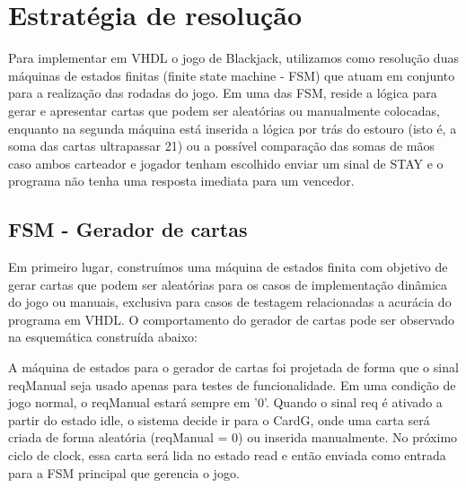 \documentclass[oneside]{uffstex}
\begin{document}
\chapter{Estratégia de resolução}
Para implementar em VHDL o jogo de Blackjack, utilizamos como resolução duas máquinas de estados finitas (finite state machine - FSM) que atuam em conjunto para a realização das rodadas do jogo. Em uma das FSM, reside a lógica para gerar e apresentar cartas que podem ser aleatórias ou manualmente colocadas, enquanto na segunda máquina está inserida a lógica por trás do estouro (isto é, a soma das cartas ultrapassar 21) ou a possível comparação das somas de mãos caso ambos carteador e jogador tenham escolhido enviar um sinal de STAY e o programa não tenha uma resposta imediata para um vencedor.
\section{FSM - Gerador de cartas}
Em primeiro lugar, construímos uma máquina de estados finita com objetivo de gerar cartas que podem ser aleatórias para os casos de implementação dinâmica do jogo ou manuais, exclusiva para casos de testagem relacionadas a acurácia do programa em VHDL. O comportamento do gerador de cartas pode ser observado na esquemática construída abaixo:
\begin{center}
\end{center}
A máquina de estados para o gerador de cartas foi projetada de forma que o sinal reqManual seja usado apenas para testes de funcionalidade. Em uma condição de jogo normal, o reqManual estará sempre em '0'. Quando o sinal req é ativado a partir do estado idle, o sistema decide ir para o CardG, onde uma carta será criada de forma aleatória (reqManual = 0) ou inserida manualmente. No próximo ciclo de clock, essa carta será lida no estado read e então enviada como entrada para a FSM principal que gerencia o jogo.
\end{document}
